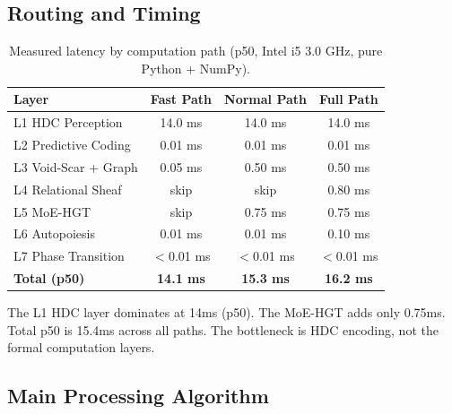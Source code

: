 \documentclass[11pt]{article}
\begin{document}
\subsection{Routing and Timing}

\begin{table}[H]
\centering
\caption{Measured latency by computation path (p50, Intel i5 3.0 GHz, pure Python + NumPy).}
\label{tab:timing}
\begin{tabular}{lccc}
\toprule
Layer & Fast Path & Normal Path & Full Path \\
\midrule
L1 HDC Perception & 14.0 ms & 14.0 ms & 14.0 ms \\
L2 Predictive Coding & 0.01 ms & 0.01 ms & 0.01 ms \\
L3 Void-Scar + Graph & 0.05 ms & 0.50 ms & 0.50 ms \\
L4 Relational Sheaf & skip & skip & 0.80 ms \\
L5 MoE-HGT & skip & 0.75 ms & 0.75 ms \\
L6 Autopoiesis & 0.01 ms & 0.01 ms & 0.10 ms \\
L7 Phase Transition & $<$0.01 ms & $<$0.01 ms & $<$0.01 ms \\
\midrule
\textbf{Total (p50)} & \textbf{14.1 ms} & \textbf{15.3 ms} & \textbf{16.2 ms} \\
\bottomrule
\end{tabular}
\end{table}

The L1 HDC layer dominates at 14ms (p50). The MoE-HGT adds only 0.75ms. Total p50 is 15.4ms across all paths. The bottleneck is HDC encoding, not the formal computation layers.

\subsection{Main Processing Algorithm}
\end{document}
